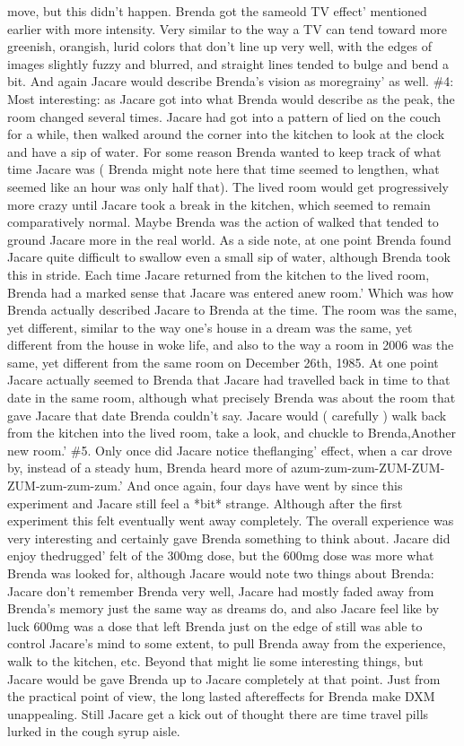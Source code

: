 \documentclass[12pt]{book}
\begin{document}
move, but this didn't happen. Brenda got the sameold TV effect' mentioned earlier with more intensity. Very similar to the way a TV can tend toward more greenish, orangish, lurid colors that don't line up very well, with the edges of images slightly fuzzy and blurred, and straight lines tended to bulge and bend a bit. And again Jacare would describe Brenda's vision as moregrainy' as well. \#4: Most interesting: as Jacare got into what Brenda would describe as the peak, the room changed several times. Jacare had got into a pattern of lied on the couch for a while, then walked around the corner into the kitchen to look at the clock and have a sip of water. For some reason Brenda wanted to keep track of what time Jacare was ( Brenda might note here that time seemed to lengthen, what seemed like an hour was only half that). The lived room would get progressively more crazy until Jacare took a break in the kitchen, which seemed to remain comparatively normal. Maybe Brenda was the action of walked that tended to ground Jacare more in the real world. As a side note, at one point Brenda found Jacare quite difficult to swallow even a small sip of water, although Brenda took this in stride. Each time Jacare returned from the kitchen to the lived room, Brenda had a marked sense that Jacare was entered anew room.' Which was how Brenda actually described Jacare to Brenda at the time. The room was the same, yet different, similar to the way one's house in a dream was the same, yet different from the house in woke life, and also to the way a room in 2006 was the same, yet different from the same room on December 26th, 1985. At one point Jacare actually seemed to Brenda that Jacare had travelled back in time to that date in the same room, although what precisely Brenda was about the room that gave Jacare that date Brenda couldn't say. Jacare would ( carefully ) walk back from the kitchen into the lived room, take a look, and chuckle to Brenda,Another new room.' \#5. Only once did Jacare notice theflanging' effect, when a car drove by, instead of a steady hum, Brenda heard more of azum-zum-zum-ZUM-ZUM-ZUM-zum-zum-zum.' And once again, four days have went by since this experiment and Jacare still feel a *bit* strange. Although after the first experiment this felt eventually went away completely. The overall experience was very interesting and certainly gave Brenda something to think about. Jacare did enjoy thedrugged' felt of the 300mg dose, but the 600mg dose was more what Brenda was looked for, although Jacare would note two things about Brenda: Jacare don't remember Brenda very well, Jacare had mostly faded away from Brenda's memory just the same way as dreams do, and also Jacare feel like by luck 600mg was a dose that left Brenda just on the edge of still was able to control Jacare's mind to some extent, to pull Brenda away from the experience, walk to the kitchen, etc. Beyond that might lie some interesting things, but Jacare would be gave Brenda up to Jacare completely at that point. Just from the practical point of view, the long lasted aftereffects for Brenda make DXM unappealing. Still Jacare get a kick out of thought there are time travel pills lurked in the cough syrup aisle.
\end{document}
